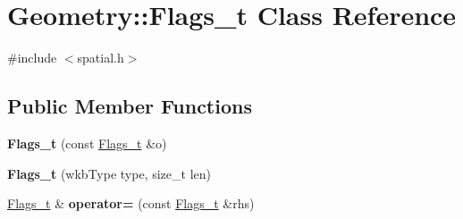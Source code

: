 \hypertarget{classGeometry_1_1Flags__t}{}\section{Geometry\+:\+:Flags\+\_\+t Class Reference}
\label{classGeometry_1_1Flags__t}


{\ttfamily \#include $<$spatial.\+h$>$}

\subsection*{Public Member Functions}
\begin{DoxyCompactItemize}
\item 
\mbox{\label{classGeometry_1_1Flags__t_aabc09c38cf3fb4e9923e3e00e3466845}} 
{\bfseries Flags\+\_\+t} (const \mbox{\hyperlink{classGeometry_1_1Flags__t}{Flags\+\_\+t}} \&o)
\item 
\mbox{\label{classGeometry_1_1Flags__t_ab62f27f6be199d599c84a8ff8f81ce62}} 
{\bfseries Flags\+\_\+t} (wkb\+Type type, size\+\_\+t len)
\item 
\mbox{\label{classGeometry_1_1Flags__t_a699fd9e29308cfb90564fe3d54756f7c}} 
\mbox{\hyperlink{classGeometry_1_1Flags__t}{Flags\+\_\+t}} \& {\bfseries operator=} (const \mbox{\hyperlink{classGeometry_1_1Flags__t}{Flags\+\_\+t}} \&rhs)
\end{DoxyCompactItemize}
